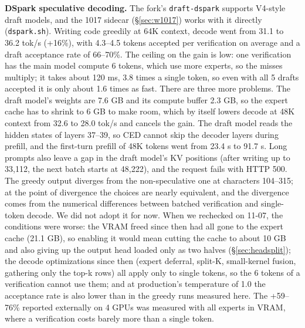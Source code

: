 \documentclass[11pt,a4paper]{article}
\newcommand{\code}[1]{\texttt{#1}}
\newcommand{\tps}{tok/s}
\begin{document}
\textbf{DSpark speculative decoding.} The fork's \code{draft-dspark} supports V4-style draft models, and the 1017 sidecar (\S\ref{sec:w1017}) works with it directly (\code{dspark.sh}). Writing code greedily at 64K context, decode went from 31.1 to 36.2 \tps{} (+16\%), with 4.3--4.5 tokens accepted per verification on average and a draft acceptance rate of 66--70\%. The ceiling on the gain is low: one verification has the main model compute 6 tokens, which use more experts, so the misses multiply; it takes about 120 ms, 3.8 times a single token, so even with all 5 drafts accepted it is only about 1.6 times as fast. There are three more problems. The draft model's weights are 7.6 GB and its compute buffer 2.3 GB, so the expert cache has to shrink to 6 GB to make room, which by itself lowers decode at 48K context from 32.6 to 28.0 \tps{} and cancels the gain. The draft model reads the hidden states of layers 37--39, so CED cannot skip the decoder layers during prefill, and the first-turn prefill of 48K tokens went from 23.4 s to 91.7 s. Long prompts also leave a gap in the draft model's KV positions (after writing up to 33,112, the next batch starts at 48,222), and the request fails with HTTP 500. The greedy output diverges from the non-speculative one at characters 104--315; at the point of divergence the choices are nearly equivalent, and the divergence comes from the numerical differences between batched verification and single-token decode. We did not adopt it for now. When we rechecked on 11-07, the conditions were worse: the VRAM freed since then had all gone to the expert cache (21.1 GB), so enabling it would mean cutting the cache to about 10 GB and also giving up the output head loaded only as two halves (\S\ref{sec:headsplit}); the decode optimizations since then (expert deferral, split-K, small-kernel fusion, gathering only the top-k rows) all apply only to single tokens, so the 6 tokens of a verification cannot use them; and at production's temperature of 1.0 the acceptance rate is also lower than in the greedy runs measured here. The +59--76\% reported externally on 4 GPUs was measured with all experts in VRAM, where a verification costs barely more than a single token.
\end{document}
